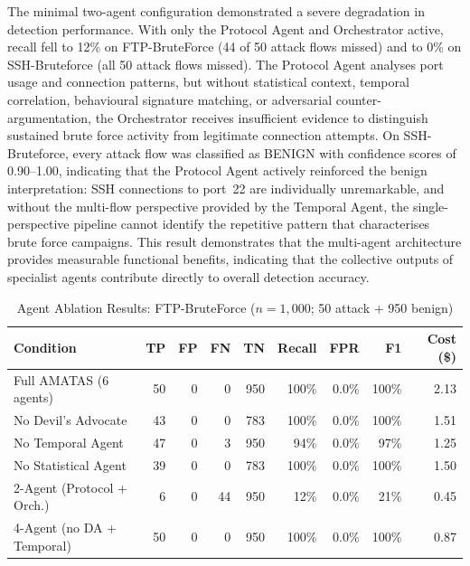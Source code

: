 \documentclass[../main.tex]{subfiles}
\begin{document}
The minimal two-agent configuration demonstrated a severe degradation in detection performance. With only the Protocol Agent and Orchestrator active, recall fell to 12\% on FTP-BruteForce (44 of 50 attack flows missed) and to 0\% on SSH-Bruteforce (all 50 attack flows missed). The Protocol Agent analyses port usage and connection patterns, but without statistical context, temporal correlation, behavioural signature matching, or adversarial counter-argumentation, the Orchestrator receives insufficient evidence to distinguish sustained brute force activity from legitimate connection attempts. On SSH-Bruteforce, every attack flow was classified as BENIGN with confidence scores of 0.90--1.00, indicating that the Protocol Agent actively reinforced the benign interpretation: SSH connections to port~22 are individually unremarkable, and without the multi-flow perspective provided by the Temporal Agent, the single-perspective pipeline cannot identify the repetitive pattern that characterises brute force campaigns. This result demonstrates that the multi-agent architecture provides measurable functional benefits, indicating that the collective outputs of specialist agents contribute directly to overall detection accuracy.

\begin{table}[H]
\centering
\caption{Agent Ablation Results: FTP-BruteForce ($n = 1{,}000$; 50 attack + 950 benign)}
\label{tab:ablation-ftp}
\small
\begin{tabular}{@{}l r r r r r r r r@{}}
\toprule
Condition & TP & FP & FN & TN & Recall & FPR & F1 & Cost (\$) \\
\midrule
Full AMATAS (6 agents) & 50 & 0 & 0 & 950 & 100\% & 0.0\% & 100\% & 2.13 \\
No Devil's Advocate & 43 & 0 & 0 & 783 & 100\% & 0.0\% & 100\% & 1.51 \\
No Temporal Agent & 47 & 0 & 3 & 950 & 94\% & 0.0\% & 97\% & 1.25 \\
No Statistical Agent & 39 & 0 & 0 & 783 & 100\% & 0.0\% & 100\% & 1.50 \\
2-Agent (Protocol + Orch.) & 6 & 0 & 44 & 950 & 12\% & 0.0\% & 21\% & 0.45 \\
4-Agent (no DA + Temporal) & 50 & 0 & 0 & 950 & 100\% & 0.0\% & 100\% & 0.87 \\
\bottomrule
\end{tabular}
\end{table}
\end{document}
